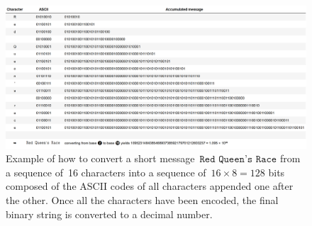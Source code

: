 \documentclass{article}
\begin{document}
\begin{figure}[!b]
\hspace*{-2.25cm}
\centering
\includegraphics[scale=0.7]{integerTranslation.png}
\caption{Example of how to convert a short message~$\texttt{Red Queen's Race}$ from a sequence of~16 characters into a sequence of~$16 \times 8 = 128$ bits composed of the ASCII codes of all characters appended one after the other.  Once all the characters have been encoded, the final binary string is converted to a decimal number.}
\label{fig:integerTranslation}
\end{figure}
\end{document}
